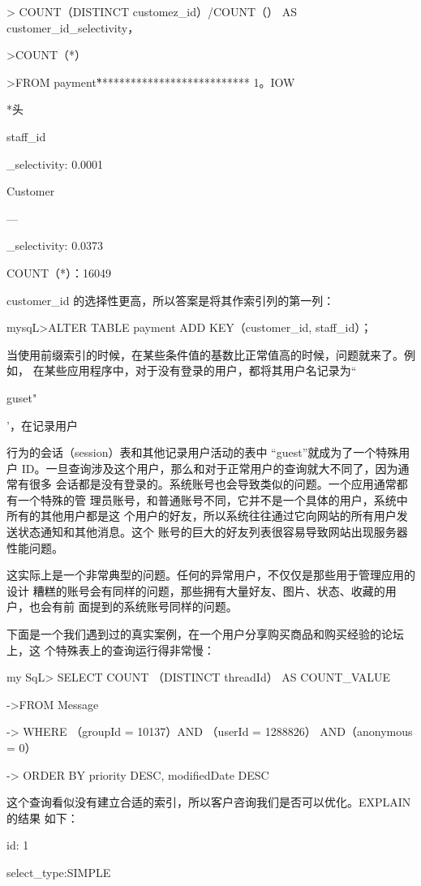 > COUNT（DISTINCT customez\_id）/COUNT（） AS customer\_id\_selectivity，

>COUNT（*）

>FROM payment\G

*************************** 1。IOW

*头

staff\_id

\_selectivity: 0.0001

Customer

—

\_selectivity: 0.0373

COUNT（*）：16049

customer\_id 的选择性更高，所以答案是将其作索引列的第一列：

mysqL>ALTER TABLE payment ADD KEY（customer\_id, staff\_id）；

当使用前缀索引的时候，在某些条件值的基数比正常值高的时候，问题就来了。例如，
在某些应用程序中，对于没有登录的用户，都将其用户名记录为“

guset"

’，在记录用户

行为的会话（session）表和其他记录用户活动的表中 “guest”就成为了一个特殊用户
ID。一旦查询涉及这个用户，那么和对于正常用户的查询就大不同了，因为通常有很多
会话都是没有登录的。系统账号也会导致类似的问题。一个应用通常都有一个特殊的管
理员账号，和普通账号不同，它并不是一个具体的用户，系统中所有的其他用户都是这
个用户的好友，所以系统往往通过它向网站的所有用户发送状态通知和其他消息。这个
账号的巨大的好友列表很容易导致网站出现服务器性能问题。

这实际上是一个非常典型的问题。任何的异常用户，不仅仅是那些用于管理应用的设计
糟糕的账号会有同样的问题，那些拥有大量好友、图片、状态、收藏的用户，也会有前
面提到的系统账号同样的问题。

下面是一个我们遇到过的真实案例，在一个用户分享购买商品和购买经验的论坛上，这
个特殊表上的查询运行得非常慢：

my SqL> SELECT COUNT （DISTINCT threadId） AS COUNT\_VALUE

->FROM Message

-> WHERE （groupId = 10137）AND （userId = 1288826） AND（anonymous = 0）

-> ORDER BY priority DESC, modifiedDate DESC

这个查询看似没有建立合适的索引，所以客户咨询我们是否可以优化。EXPLAIN的结果
如下：

id: 1

select\_type:SIMPLE

